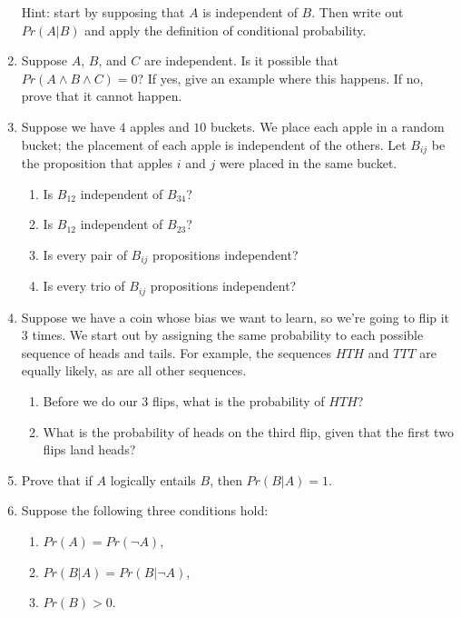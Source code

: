 \documentclass[]{tufte-book}
\providecommand{\tightlist}{%
  \setlength{\itemsep}{0pt}\setlength{\parskip}{0pt}}
\begin{document}
\begin{enumerate}
  Hint: start by supposing that \(A\) is independent of \(B\). Then write out \(Pr(A | B)\) and apply the definition of conditional probability.
\item
  Suppose \(A\), \(B\), and \(C\) are independent. Is it possible that \(Pr(A \wedge B \wedge C) = 0\)? If yes, give an example where this happens. If no, prove that it cannot happen.
\item
  Suppose we have \(4\) apples and \(10\) buckets. We place each apple in a random bucket; the placement of each apple is independent of the others. Let \(B_{ij}\) be the proposition that apples \(i\) and \(j\) were placed in the same bucket.

  \begin{enumerate}
  \def\labelenumii{\alph{enumii}.}
  \tightlist
  \item
    Is \(B_{12}\) independent of \(B_{34}\)?
  \item
    Is \(B_{12}\) independent of \(B_{23}\)?
  \item
    Is every pair of \(B_{ij}\) propositions independent?
  \item
    Is every trio of \(B_{ij}\) propositions independent?
  \end{enumerate}
\item
  Suppose we have a coin whose bias we want to learn, so we're going to flip it \(3\) times. We start out by assigning the same probability to each possible sequence of heads and tails. For example, the sequences \(HTH\) and \(TTT\) are equally likely, as are all other sequences.

  \begin{enumerate}
  \def\labelenumii{\alph{enumii}.}
  \tightlist
  \item
    Before we do our \(3\) flips, what is the probability of \(HTH\)?
  \item
    What is the probability of heads on the third flip, given that the first two flips land heads?
  \end{enumerate}
\item
  Prove that if \(A\) logically entails \(B\), then \(Pr(B | A) = 1\).
\item
  Suppose the following three conditions hold:

  \begin{enumerate}
  \def\labelenumii{\roman{enumii}.}
  \tightlist
  \item
    \(Pr(A) = Pr(\neg A)\),
  \item
    \(Pr(B | A) = Pr(B | \neg A)\),
  \item
    \(Pr(B) > 0\).
  \end{enumerate}


\end{enumerate}
\end{document}
